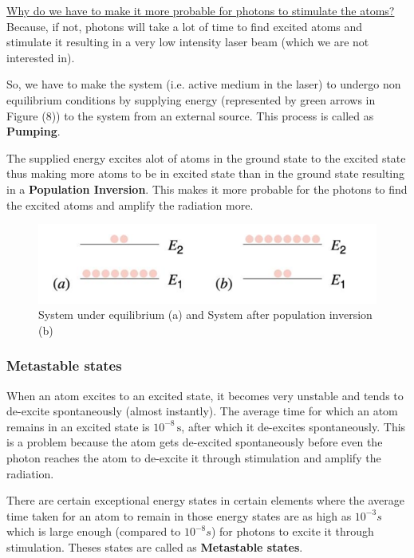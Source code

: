 \documentclass[12pt]{article}
\begin{document}
\uline{Why do we have to make it more probable for photons to stimulate the atoms?} Because, if not, photons will take a lot of time to find excited atoms and stimulate it resulting in a very low intensity laser beam (which we are not interested in). \vspace{.2cm}

So, we have to make the system (i.e. active medium in the laser) to undergo non equilibrium conditions by supplying energy (represented by green arrows in Figure (8)) to the system from an external source. This process is called as \textbf{Pumping}. \vspace{.2cm}

The supplied energy excites alot of atoms in the ground state to the excited state thus making more atoms to be in excited state than in the ground state resulting in a \textbf{Population Inversion}. This makes it more probable for the photons to find the excited atoms and amplify the radiation more. \vspace{.2cm}

\begin{figure}[H]
    \centering
    \includegraphics[scale=.8]{./img/10_population_inversion.png}
    \caption{System under equilibrium (a) and System after population inversion (b)}
\end{figure}

\subsubsection{Metastable states}

When an atom excites to an excited state, it becomes very unstable and tends to de-excite spontaneously (almost instantly). The average time for which an atom remains in an excited state is $10^{-8}\,\text{s}$, after which it de-excites spontaneously. This is a problem because the atom gets de-excited spontaneously before even the photon reaches the atom to de-excite it through stimulation and amplify the radiation.
\vspace{.2cm}

There are certain exceptional energy states in certain elements where the average time taken for an atom to remain in those energy states are as high as $10^{-3}s$ which is large enough (compared to $10^{-8}s$) for photons to excite it through stimulation. Theses states are called as \textbf{Metastable states}. \vspace{.2cm} 
\end{document}
